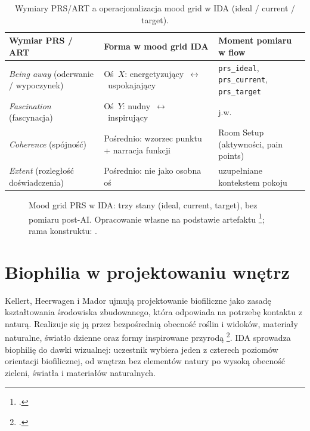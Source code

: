 \begin{table}[htbp]
  \centering
  \caption{Wymiary PRS/ART a operacjonalizacja mood grid w IDA (ideal / current / target).}
  \label{tab:ch02:prs-mood-grid}
  \begin{tabular}{@{}p{}p{}p{}@{}}
    \toprule
    Wymiar PRS / ART & Forma w mood grid IDA & Moment pomiaru w flow \\
    \midrule
    \emph{Being away} (oderwanie / wypoczynek)
      & Oś~$X$: energetyzujący~$\leftrightarrow$~uspokajający
      & \texttt{prs\_ideal}, \texttt{prs\_current}, \texttt{prs\_target} \\
    \emph{Fascination} (fascynacja)
      & Oś~$Y$: nudny~$\leftrightarrow$~inspirujący
      & j.w. \\
    \emph{Coherence} (spójność)
      & Pośrednio: wzorzec punktu + narracja funkcji
      & Room Setup (aktywności, pain points) \\
    \emph{Extent} (rozległość doświadczenia)
      & Pośrednio: nie jako osobna oś
      & uzupełniane kontekstem pokoju \\
    \bottomrule
  \end{tabular}
\end{table}

\begin{figure}[htbp]
  \centering
  \caption{Mood grid PRS w IDA: trzy stany (ideal, current, target), bez pomiaru post-AI.
    Opracowanie własne na podstawie artefaktu \footcite{idaPlatform2026}; rama konstruktu: \textcite{hartig1997prs}.}
  \label{fig:ch02:prs-mood-grid}
\end{figure}

\section{Biophilia w projektowaniu wnętrz}
\label{ch02:sec:biophilia}

Kellert, Heerwagen i Mador ujmują projektowanie biofiliczne jako zasadę kształtowania środowiska zbudowanego, która odpowiada na potrzebę kontaktu z naturą. Realizuje się ją przez bezpośrednią obecność roślin i widoków, materiały naturalne, światło dzienne oraz formy inspirowane przyrodą \footcite{kellert2008biophilic}.
IDA sprowadza biophilię do dawki wizualnej: uczestnik wybiera jeden z czterech poziomów orientacji biofilicznej, od wnętrza bez elementów natury po wysoką obecność zieleni, światła i materiałów naturalnych.

